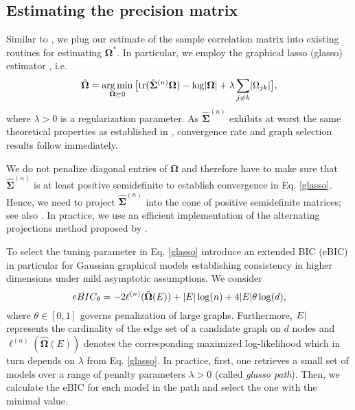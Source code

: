 \subsection{Estimating the precision matrix}\label{sec:precision_matrix}

Similar to \citet{Fan17}, we plug our estimate of the sample correlation matrix into existing routines for estimating $\mathbf{\Omega}^*$. In particular, we employ the graphical lasso (glasso) estimator \citep{Friedman08}, i.e.
\begin{equation}\label{glasso}
    \hat{\mathbf\Omega} = \argmin_{\mathbf\Omega \succeq 0} \big[\text{tr}(\hat{\mathbf\Sigma}^{(n)}\mathbf\Omega) - \log\Abs{\mathbf\Omega} + \lambda \sum_{j\neq k}\Abs{\Omega_{jk}}\big],
\end{equation}
where $\lambda > 0$ is a regularization parameter. As $\hat{\mathbf\Sigma}^{(n)}$ exhibits at worst the same theoretical properties as established in %
\citet{Liu09}, convergence rate and graph selection results follow immediately.

We do not penalize diagonal entries of $\mathbf\Omega$ and therefore have to make sure that $\hat{\mathbf\Sigma}^{(n)}$ is at least positive semidefinite to establish convergence in Eq. \eqref{glasso}. Hence, we need to project $\hat{\mathbf\Sigma}^{(n)}$ into the cone of positive semidefinite matrices; see also \citep{Liu12, Fan17}. In practice, we use an efficient implementation of the alternating projections method proposed by \citet{Higham88}.

To select the tuning parameter in Eq. \eqref{glasso}
\citet{Foygel10} introduce an extended BIC (eBIC) in particular for Gaussian graphical models establishing consistency in higher dimensions under mild asymptotic assumptions. We consider
\begin{equation}\label{EBIC}
    eBIC_\theta = -2 \ell^{(n)}(\hat{\mathbf\Omega}(E)) + \Abs{E} \log(n) + 4 \Abs{E}\theta \log(d),
\end{equation}
where $\theta \in [0,1]$ governs penalization of large graphs. Furthermore, $\abs{E}$ represents the cardinality of the edge set of a candidate graph on $d$ nodes and $\ell^{(n)}(\hat{\mathbf\Omega}(E))$ denotes the corresponding maximized log-likelihood which in turn depends on $\lambda$ from Eq. \eqref{glasso}. In practice, first, one retrieves a small set of models over a range of penalty parameters $\lambda > 0$ (called \textit{glasso path}). Then, we calculate the eBIC for each model in the path and select the one with the minimal value.

